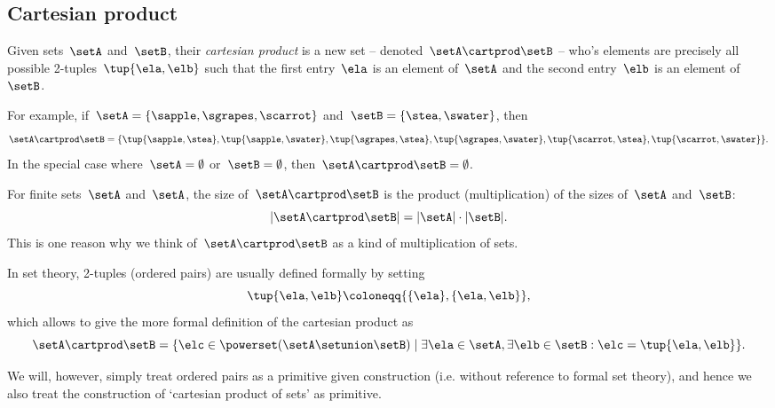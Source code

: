 \subsection{Cartesian product}\label{sec:cartesian-product}

Given sets~$\setA$ and~$\setB$, their \emph{cartesian product} is a new set -- denoted~$\setA \cartprod \setB$ -- who's elements are precisely all possible 2-tuples~$\tup{\ela, \elb}$ such that the first entry~$\ela$ is an element of~$\setA$ and the second entry~$\elb$ is an element of~$\setB$.

For example, if~$\setA = \{ \sapple, \sgrapes, \scarrot\}$ and~$\setB = \{ \stea, \swater \}$, then
\begin{equation*}
    \setA \cartprod \setB = \{ \tup{\sapple, \stea}, \tup{\sapple, \swater}, \tup{\sgrapes, \stea}, \tup{\sgrapes, \swater},  \tup{\scarrot, \stea}, \tup{\scarrot, \swater}\}.
\end{equation*}
In the special case where~$\setA = \emptyset$ or~$\setB = \emptyset$, then~$\setA \cartprod \setB = \emptyset$.

\begin{remark}
    For finite sets~$\setA$ and~$\setA$, the size of~$\setA \cartprod \setB$ is the product (multiplication) of the sizes of~$\setA$ and~$\setB$:
    \begin{equation*}
        \vert \setA \cartprod \setB \vert = \vert \setA \vert \cdot \vert \setB \vert.
    \end{equation*}
    This is one reason why we think of~$\setA \cartprod \setB$ as a kind of multiplication of sets.
\end{remark}

In set theory, 2-tuples (ordered pairs) are usually defined formally by setting
\begin{equation}
    \label{eq:ordered-pair}
    \tup{\ela, \elb} \coloneqq \{ \{\ela \} , \{ \ela, \elb \} \},
\end{equation}
which allows to give the more formal definition of the cartesian product as
\begin{equation}
    \setA \cartprod \setB = \{ \elc \in \powerset (\setA \setunion \setB) \mid \exists \ela \in \setA, \exists \elb \in \setB : \elc = \tup{\ela, \elb} \}.
\end{equation}

We will, however, simply treat ordered pairs as a primitive given construction (i.e. without reference to formal set theory), and hence we also treat the construction of `cartesian product of sets' as primitive.

